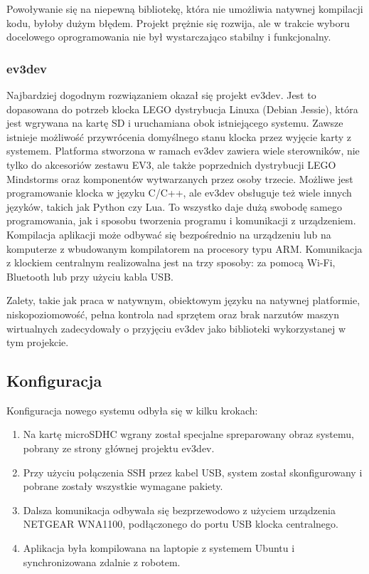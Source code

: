 Powoływanie się na niepewną bibliotekę, która nie umożliwia natywnej kompilacji kodu, byłoby dużym błędem. Projekt prężnie się rozwija, ale w trakcie wyboru docelowego oprogramowania nie był wystarczająco stabilny i funkcjonalny.

\subsubsection{ev3dev}

Najbardziej dogodnym rozwiązaniem okazał się projekt ev3dev. Jest to dopasowana do potrzeb klocka LEGO dystrybucja Linuxa (Debian Jessie), która jest wgrywana na kartę SD i uruchamiana obok istniejącego systemu. Zawsze istnieje możliwość przywrócenia domyślnego stanu klocka przez wyjęcie karty z systemem. Platforma stworzona w ramach ev3dev zawiera wiele sterowników, nie tylko do akcesoriów zestawu EV3, ale także poprzednich dystrybucji LEGO Mindstorms oraz komponentów wytwarzanych przez osoby trzecie. Możliwe jest programowanie klocka w języku C/C++, ale ev3dev obsługuje też wiele innych języków, takich jak Python czy Lua. To wszystko daje dużą swobodę samego programowania, jak i sposobu tworzenia programu i komunikacji z urządzeniem. Kompilacja aplikacji może odbywać się bezpośrednio na urządzeniu lub na komputerze z wbudowanym kompilatorem na procesory typu ARM. Komunikacja z klockiem centralnym realizowalna jest na trzy sposoby: za pomocą Wi-Fi, Bluetooth lub przy użyciu kabla USB.

Zalety, takie jak praca w natywnym, obiektowym języku na natywnej platformie, niskopoziomowość, pełna kontrola nad sprzętem oraz brak narzutów maszyn wirtualnych zadecydowały o przyjęciu ev3dev jako biblioteki wykorzystanej w tym projekcie.

\subsection{Konfiguracja}
Konfiguracja nowego systemu odbyła się w kilku krokach:

\begin{enumerate}
    \item Na kartę microSDHC wgrany został specjalne spreparowany obraz systemu, pobrany ze strony głównej projektu ev3dev.
    \item Przy użyciu połączenia SSH przez kabel USB, system został skonfigurowany i pobrane zostały wszystkie wymagane pakiety.
    \item Dalsza komunikacja odbywała się bezprzewodowo z użyciem urządzenia NETGEAR WNA1100, podłączonego do portu USB klocka centralnego.
    \item Aplikacja była kompilowana na laptopie z systemem Ubuntu i synchronizowana zdalnie z robotem.
\end{enumerate}

